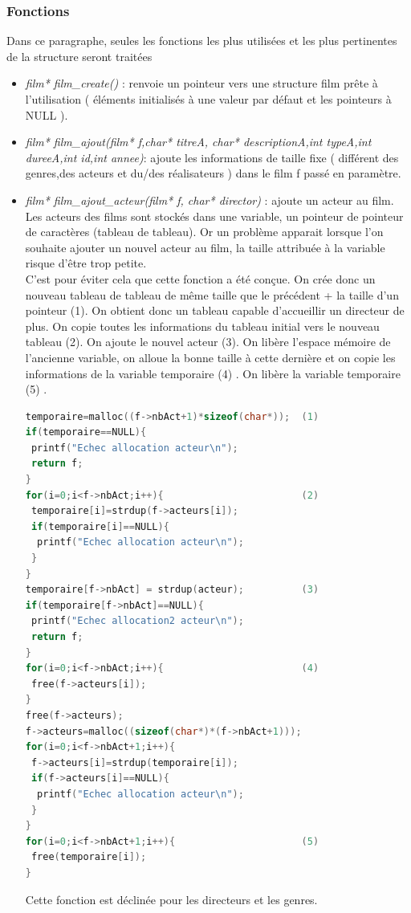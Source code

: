 \documentclass{article}
\begin{document}
\subsubsection{Fonctions}
    Dans ce paragraphe, seules les fonctions les plus utilisées et les plus pertinentes de la structure seront traitées
    \begin{itemize}
        \item \textit{ film* film\_create() }: renvoie un pointeur vers une structure film prête à l'utilisation ( éléments initialisés à une valeur par défaut et les pointeurs à NULL ).
        \item \textit{film* film\_ajout(film* f,char* titreA, char* descriptionA,int typeA,int dureeA,int id,int annee)}: ajoute les informations de taille fixe ( différent des genres,des acteurs et du/des réalisateurs ) dans le film f passé en paramètre.
    \item \textit{film* film\_ajout\_acteur(film* f, char* director)} : ajoute un acteur au film.\\
    Les acteurs des films sont stockés dans une variable, un pointeur de pointeur de caractères (tableau de tableau). Or un problème apparait lorsque l'on souhaite ajouter un nouvel acteur au film, la taille attribuée à la variable risque d'être trop petite.\\
    C'est pour éviter cela que cette fonction a été conçue. On crée donc un nouveau tableau de tableau de même taille que le précédent + la taille d'un pointeur (1). On obtient donc un tableau capable d'accueillir un directeur de plus. On copie toutes les informations du tableau initial vers le nouveau tableau (2). On ajoute le nouvel acteur (3). On libère l'espace mémoire de l'ancienne variable, on alloue la bonne taille à cette dernière et on copie les informations de la variable temporaire (4) . On libère la variable temporaire (5) .

    \begin{lstlisting}[language=C]
temporaire=malloc((f->nbAct+1)*sizeof(char*));  (1)
if(temporaire==NULL){
 printf("Echec allocation acteur\n");
 return f;
}
for(i=0;i<f->nbAct;i++){                        (2)
 temporaire[i]=strdup(f->acteurs[i]);
 if(temporaire[i]==NULL){
  printf("Echec allocation acteur\n");
 }
}
temporaire[f->nbAct] = strdup(acteur);          (3)
if(temporaire[f->nbAct]==NULL){
 printf("Echec allocation2 acteur\n");
 return f;
}
for(i=0;i<f->nbAct;i++){                        (4)
 free(f->acteurs[i]);
}
free(f->acteurs);
f->acteurs=malloc((sizeof(char*)*(f->nbAct+1)));
for(i=0;i<f->nbAct+1;i++){
 f->acteurs[i]=strdup(temporaire[i]);
 if(f->acteurs[i]==NULL){
  printf("Echec allocation acteur\n");
 }
}
for(i=0;i<f->nbAct+1;i++){                      (5)
 free(temporaire[i]);
}
    \end{lstlisting}
    Cette fonction est déclinée pour les directeurs et les genres.
    

\end{itemize}
\end{document}
